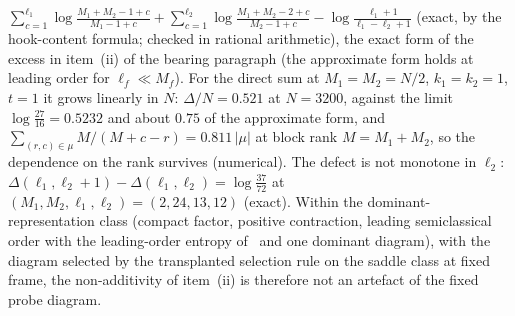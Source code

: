\(\sum_{c=1}^{\ell_1}\log\frac{M_1+M_2-1+c}{M_1-1+c}+\sum_{c=1}^{\ell_2}\log\frac{M_1+M_2-2+c}{M_2-1+c}-\log\frac{\ell_1+1}{\ell_1-\ell_2+1}\) (exact, by the hook-content formula; checked in rational arithmetic), the exact form of the excess in item~(ii) of the bearing paragraph (the approximate form holds at leading order for \(\ell_f\ll M_f\)). For the direct sum at \(M_1=M_2=N/2\), \(k_1=k_2=1\), \(t=1\) it grows linearly in \(N\): \(\Delta/N=0.521\) at \(N=3200\), against the limit \(\log\frac{27}{16}=0.5232\) and about \(0.75\) of the approximate form, and \(\sum_{(r,c)\in\mu}M/(M+c-r)=0.811\,|\mu|\) at block rank \(M=M_1+M_2\), so the dependence on the rank survives (numerical). The defect is not monotone in \(\ell_2\): \(\Delta(\ell_1,\ell_2+1)-\Delta(\ell_1,\ell_2)=\log\frac{37}{72}\) at \((M_1,M_2,\ell_1,\ell_2)=(2,24,13,12)\) (exact). Within the dominant-representation class (compact factor, positive contraction, leading semiclassical order with the leading-order entropy of~\cite{FlissFrenkelHartnollSoni2025} and one dominant diagram), with the diagram selected by the transplanted selection rule on the saddle class at fixed frame, the non-additivity of item~(ii) is therefore not an artefact of the fixed probe diagram.

